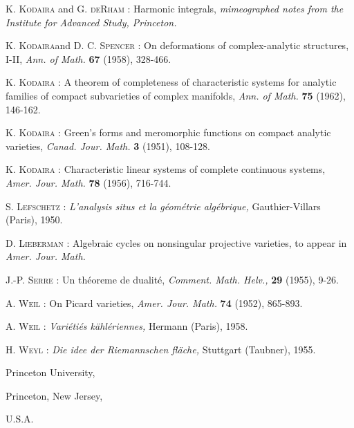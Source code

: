 \begin{thebibliography}{99}
 \textsc{K. Kodaira} and \textsc{G. deRham :} Harmonic integrals, {\em mimeographed notes from the Institute for Advanced Study, Princeton.}

 \textsc{K. Kodaira}\pageoriginale and \textsc{D. C. Spencer :} On deformations of complex-analytic structures, I-II, {\em Ann. of Math.} {\bf 67} (1958), 328-466.

 \textsc{K. Kodaira :} A theorem of completeness of characteristic systems for analytic families of compact subvarieties of complex manifolds, {\em Ann. of Math.} {\bf 75} (1962), 146-162.

 \textsc{K. Kodaira :} Green's forms and meromorphic functions on compact analytic varieties, {\em Canad. Jour. Math.} {\bf 3} (1951), 108-128.

 \textsc{K. Kodaira :} Characteristic linear systems of complete continuous systems, {\em Amer. Jour. Math.} {\bf 78} (1956), 716-744.

 \textsc{S. Lefschetz :} {\em L'analysis situs et la g\'eom\'etrie alg\'ebrique,} Gauthier-Villars (Paris), 1950.

 \textsc{D. Lieberman :} Algebraic cycles on nonsingular projective varieties, to appear in {\em Amer. Jour. Math.}

 \textsc{J.-P. Serre :} Un th\'eoreme de dualit\'e, {\em Comment. Math. Helv.,} {\bf 29} (1955), 9-26.

 \textsc{A. Weil :} On Picard varieties, {\em Amer. Jour. Math.} {\bf 74} (1952), 865-893.

 \textsc{A. Weil :} {\em Vari\'eti\'es k\"ahl\'eriennes,} Hermann (Paris), 1958.

 \textsc{H. Weyl :} {\em Die idee der Riemannschen fl\"ache,} Stuttgart (Taubner), 1955.
\end{thebibliography}

\noindent
{\small Princeton University,}

\noindent
{\small Princeton, New Jersey,}

\noindent
{\small U.S.A.}
